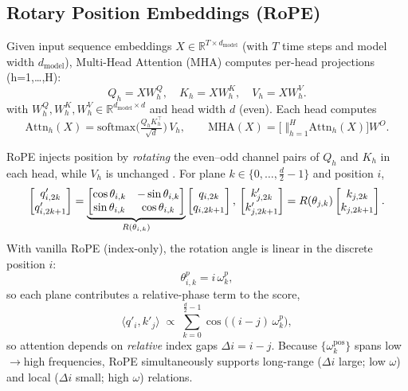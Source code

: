 \documentclass[sigconf]{acmart}
\begin{document}
\subsection{Rotary Position Embeddings (RoPE)}
Given input sequence embeddings $X \in \mathbb{R}^{T \times d_{\text{model}}}$ (with $T$ time steps and model width $d_{\text{model}}$), Multi-Head Attention (MHA) \cite{Vaswani2017AttentionIA} computes per-head projections  (h=1,\dots,H):
\[
Q_h = X W^Q_h,\quad K_h = X W^K_h,\quad V_h = X W^V_h. 
\]
with $W^Q_h,W^K_h,W^V_h\in\mathbb{R}^{d_{\text{model}}\times d}$ and head width $d$ (even). Each head computes
\[
\mathrm{Attn}_h(X)=\mathrm{softmax}\!\Big(\tfrac{Q_hK_h^\top}{\sqrt{d}}\Big)\,V_h,
\qquad
\mathrm{MHA}(X)=\Big[\;\Vert_{h=1}^{H}\mathrm{Attn}_h(X)\Big]W^O.
\]


RoPE injects position by \emph{rotating} the even–odd channel pairs of $Q_h$ and $K_h$ in each head, while $V_h$ is unchanged \cite{Su2021RoFormerET}. For plane $k\in\{0,\ldots,\tfrac{d}{2}-1\}$ and position $i$,
\begin{equation}
\label{eq:rope-rotate}
\begin{bmatrix}q'_{i,2k}\\ q'_{i,2k+1}\end{bmatrix}
=
\underbrace{\begin{bmatrix}\cos\theta_{i,k} & -\sin\theta_{i,k}\\ \sin\theta_{i,k} & \cos\theta_{i,k}\end{bmatrix}}_{R(\theta_{i,k})}
\begin{bmatrix}q_{i,2k}\\ q_{i,2k+1}\end{bmatrix},
\quad \\
\begin{bmatrix}k'_{j,2k}\\ k'_{j,2k+1}\end{bmatrix}=R(\theta_{j,k})
\begin{bmatrix}k_{j,2k}\\ k_{j,2k+1}\end{bmatrix}.
\end{equation}
With vanilla RoPE (index-only), the rotation angle is linear in the discrete position $i$:
\[
\theta^{p}_{i,k}=i\,\omega^{p}_k,
\]
so each plane contributes a relative-phase term to the score,
\begin{equation}
\label{eq:rope-relphase}
\langle q'_i,k'_j\rangle \;\propto\; \sum_{k=0}^{\frac{d}{2}-1}\cos\!\big((i-j)\,\omega^{p}_k\big),
\end{equation}
so attention depends on \emph{relative} index gaps $\Delta i=i-j$. Because $\{\omega^{\mathrm{pos}}_k\}$ spans low$\to$high frequencies, RoPE simultaneously supports long-range ($\Delta i$ large; low $\omega$) and local ($\Delta i$ small; high $\omega$) relations.
\end{document}
